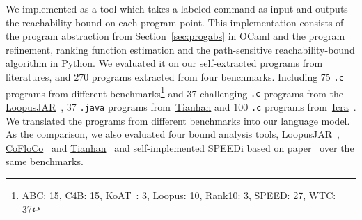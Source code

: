 We implemented {\THESYSTEM} as a tool which takes a labeled command as input  
and outputs the reachability-bound on each program point.
This implementation consists of the 
program abstraction from Section~\ref{sec:progabs} in OCaml and the program refinement, ranking function estimation and the path-sensitive reachability-bound algorithm in Python.
We evaluated it on our self-extracted programs from literatures, and 270 programs extracted from four benchmarks. 
Including 75 {\tt .c} programs from different benchmarks\footnote{ABC: 15, C4B: 15, KoAT~\cite{BrockschmidtEFFG14,FalkeKS12,FalkeKS11}: 3, Loopus: 10, Rank10: 3, SPEED: 27, WTC: 37} and 37 challenging {\tt .c} programs 
from the \hyperlink{https://forsyte.at/static/people/sinn/loopusJAR/index.html}{LoopusJAR}~\cite{SinnZV17},
37 {\tt .java} programs from~\hyperlink{https://zenodo.org/record/5140586\#.Y5pBoC-B1QI}{Tianhan}\cite{LuCT21}
and $100$ {\tt .c} programs from~\hyperlink{https://github.com/icra-team/icra}{Icra}~\cite{KincaidBCR19,CyphertBKR19}.
We translated the programs from different benchmarks into our language model.
As the comparison, we also evaluated four bound analysis tools, 
\hyperlink{https://forsyte.at/software/loopus/}{LoopusJAR}~\cite{SinnZV17},
\hyperlink{https://github.com/aeflores/CoFloCo/tree/master/src}{CoFloCo}~\cite{Montoya17,Flores-Montoya16,Flores-MontoyaH14}
and \hyperlink{https://zenodo.org/record/5140586\#.Y5pBoC-B1QI}{Tianhan}~\cite{LuCT21}
and self-implemented SPEEDi based on paper~\cite{GulwaniJK09}
over the same benchmarks.

